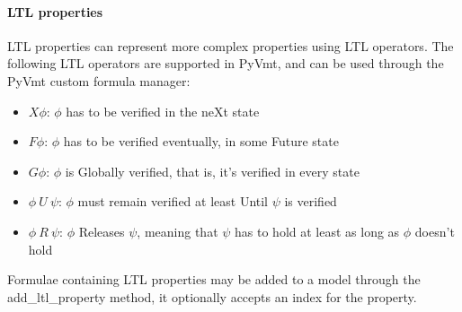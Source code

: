 \inputminted[firstline=76, lastline=83]{python}{py/modelling.py}

\paragraph*{LTL properties}

LTL properties can represent more complex properties using LTL operators.
The following LTL operators are supported in PyVmt, and can be used through the PyVmt custom formula manager:
\begin{itemize}
    \item \begin{math} X \phi \end{math}: \begin{math} \phi \end{math} has to be verified in the neXt state
    \item \begin{math} F \phi \end{math}: \begin{math} \phi \end{math} has to be verified eventually, in some Future state
    \item \begin{math} G \phi \end{math}: \begin{math} \phi \end{math} is Globally verified, that is, it's verified in every state
    \item \begin{math} \phi\ U\ \psi \end{math}: \begin{math} \phi \end{math} must remain verified at least Until \begin{math} \psi \end{math} is verified
    \item \begin{math} \phi\ R\ \psi \end{math}: \begin{math} \phi \end{math} Releases \begin{math} \psi \end{math}, meaning that \begin{math} \psi \end{math} has to hold at least as long as \begin{math} \phi \end{math} doesn't hold
\end{itemize}
Formulae containing LTL properties may be added to a model through the add\_ltl\_property method, it optionally accepts an index for the property.

